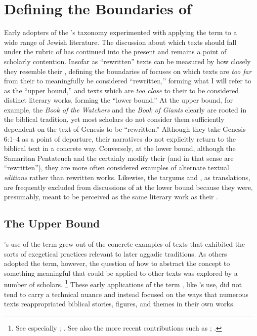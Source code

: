 \section{Defining the Boundaries of \rwb}

Early adopters of the \vermes's taxonomy experimented with applying the term \rwb to a wide range of \secondtemple Jewish literature. The discussion about which texts should fall under the rubric of \rwb has continued into the present and remains a point of scholarly contention. Insofar as ``rewritten'' texts can be measured by how closely they resemble their \vorlagen, defining the boundaries of \rwb focuses on which texts are \emph{too far} from their \vorlagen to meaningfully be considered ``rewritten,'' forming what I will refer to as the ``upper bound,'' and texts which are \emph{too close} to their \vorlagen to be considered distinct literary works, forming the ``lower bound.'' At the upper bound, for example, the \emph{Book of the Watchers} and the \emph{Book of Giants} clearly are rooted in the biblical tradition, yet most scholars do not consider them sufficiently dependent on the text of Genesis to be ``rewritten.'' Although they take Genesis 6:1--4 as a point of departure, their narratives do not explicitly return to the biblical text in a concrete way. Conversely, at the lower bound, although the Samaritan Pentateuch and the  certainly modify their \vorlagen (and in that sense are ``rewritten''), they are more often considered examples of alternate textual \emph{editions} rather than rewritten works. Likewise, the targums and \lxx, as translations, are frequently excluded from discussions of \rwb at the lower bound because they were, presumably, meant to be perceived as the same literary work as their \vorlagen. 


\subsection{The Upper Bound}

\vermes's use of the term \rwb grew out of the concrete examples of texts that exhibited the sorts of exegetical practices relevant to later aggadic traditions. As others adopted the term, however, the question of how to abstract the concept to something meaningful that could be applied to other texts was explored by a number of scholars.%
    \footnote{%
        See especially
        \cite{nickelsburg_stone1984};
        \cite{harrington_kraft-nickelsburg1986}. See also the more recent contributions such as 
        \cite{crawford2008};
        \cite{falk2007}.}
These early applications of the term \rwb, like \vermes's use, did not tend to carry a technical nuance and instead focused on the ways that numerous texts reappropriated biblical stories, figures, and themes in their own works. 

